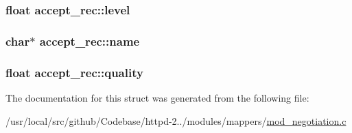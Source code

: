 \subsubsection[{\texorpdfstring{level}{level}}]{\setlength{\rightskip}{0pt plus 5cm}float accept\+\_\+rec\+::level}\hypertarget{structaccept__rec_a89e2d463155fd8770057981e002664f9}{}\label{structaccept__rec_a89e2d463155fd8770057981e002664f9}
\subsubsection[{\texorpdfstring{name}{name}}]{\setlength{\rightskip}{0pt plus 5cm}char$\ast$ accept\+\_\+rec\+::name}\hypertarget{structaccept__rec_acb7fffb4ab6a09a7972302c15b258edb}{}\label{structaccept__rec_acb7fffb4ab6a09a7972302c15b258edb}
\subsubsection[{\texorpdfstring{quality}{quality}}]{\setlength{\rightskip}{0pt plus 5cm}float accept\+\_\+rec\+::quality}\hypertarget{structaccept__rec_a97dcff520f7eecb7f1a75b694d6d9d2e}{}\label{structaccept__rec_a97dcff520f7eecb7f1a75b694d6d9d2e}


The documentation for this struct was generated from the following file\+:\begin{DoxyCompactItemize}
\item 
/usr/local/src/github/\+Codebase/httpd-\/2../modules/mappers/\hyperlink{mod__negotiation_8c}{mod\+\_\+negotiation.\+c}\end{DoxyCompactItemize}
